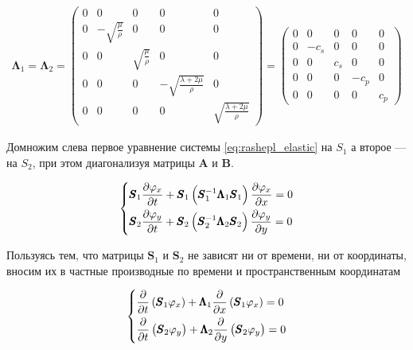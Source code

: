 \begin{gather*}
    \pmb{\Lambda}_1 = \pmb{\Lambda}_2 = 
    \begin{pmatrix}
        0 & 0 & 0 & 0 & 0\\
        0 & -\sqrt{\frac{\mu}{\rho}} & 0 & 0 & 0\\
        0 & 0 & \sqrt{\frac{\mu}{\rho}} & 0 & 0\\
        0 & 0 & 0 & -\sqrt{\frac{\lambda + 2\mu}{\rho}} & 0\\
        0 & 0 & 0 & 0 & \sqrt{\frac{\lambda + 2\mu}{\rho}}
    \end{pmatrix} = 
    \begin{pmatrix}
        0 & 0 & 0 & 0 & 0 \\
        0 & -c_s & 0 & 0 & 0 \\
        0 & 0 & c_s & 0 & 0 \\
        0 & 0 & 0 & -c_p & 0 \\
        0 & 0 & 0 & 0 & c_p
    \end{pmatrix}
\end{gather*}

Домножим слева первое уравнение системы \eqref{eq:rashepl_elastic} на $S_1$  а второе --- на $S_2$, при этом диагонализуя матрицы $\pmb{A}$ и $\pmb{B}$.

\begin{equation*}
\begin{dcases}
    \pmb{S}_1  \dfrac{\partial \varphi_x}{\partial t} +
    \pmb{S}_1 \left(\pmb{S}^{-1}_1 \pmb{\Lambda}_1 \pmb{S}_1 \right) \dfrac{\partial \varphi_x}{\partial x} = 0 \\
    \pmb{S}_2 \dfrac{\partial \varphi_y}{\partial t} + 
    \pmb{S}_2  \left(\pmb{S}^{-1}_2 \pmb{\Lambda}_2 \pmb{S}_2\right) \dfrac{\partial \varphi_y}{\partial y} = 0
\end{dcases}
\end{equation*}

Пользуясь тем, что матрицы $\pmb{S}_1$ и $\pmb{S}_2$ не зависят ни от времени, ни от координаты, вносим их в частные производные по времени и пространственным координатам 

\begin{equation*}
\begin{dcases}
    \dfrac{\partial}{\partial t} \left(\pmb{S}_1 \varphi_x\right) +
    \pmb{\Lambda}_1 \dfrac{\partial}{\partial x} \left(\pmb{S}_1 \varphi_x\right) = 0 \\
    \dfrac{\partial}{\partial t} \left(\pmb{S}_2 \varphi_y\right) + 
    \pmb{\Lambda}_2 \dfrac{\partial}{\partial y} \left(\pmb{S}_2 \varphi_y\right) = 0
\end{dcases}
\end{equation*}

